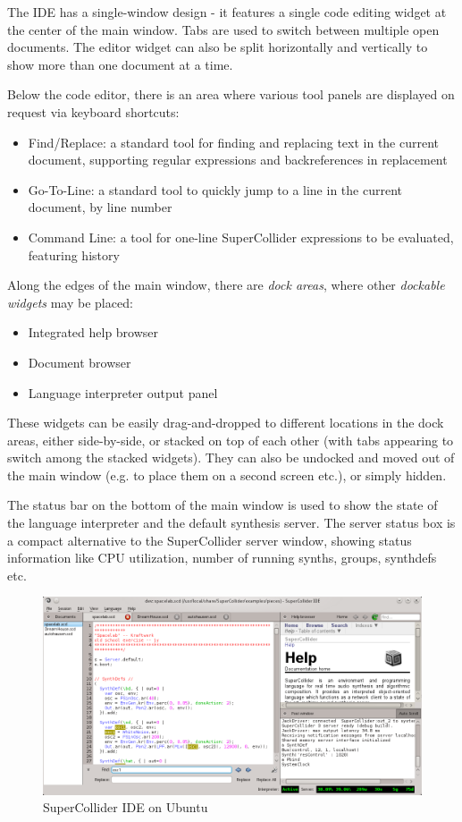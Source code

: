 \documentclass[11pt,a4paper]{article}
\begin{document}
The IDE has a single-window design - it features a single code editing widget at the center of the main window. Tabs are
used to switch between multiple open documents. The editor widget can also be split horizontally and vertically to show
more than one document at a time.

Below the code editor, there is an area where various tool panels are displayed on request via keyboard shortcuts:
\begin{itemize}
  \item Find/Replace: a standard tool for finding and replacing text in the current document, supporting regular
expressions and backreferences in replacement
  \item Go-To-Line: a standard tool to quickly jump to a line in the current document, by line number
  \item Command Line: a tool for one-line SuperCollider expressions to be evaluated, featuring history
\end{itemize}

Along the edges of the main window, there are \emph{dock areas}, where other \emph{dockable widgets} may be placed:
\begin{itemize}
  \item Integrated help browser
  \item Document browser
  \item Language interpreter output panel
\end{itemize}

These widgets can be easily drag-and-dropped to different locations in the dock areas, either side-by-side, or stacked
on top of each other (with tabs appearing to switch among the stacked widgets). They can also be undocked and moved out
of the main window (e.g. to place them on a second screen etc.), or simply hidden.

The status bar on the bottom of the main window is used to show the state of the language interpreter and the default
synthesis server. The server status box is a compact alternative to the SuperCollider server window, showing status
information like CPU utilization, number of running synths, groups, synthdefs etc.

\begin{figure}
  \centering
  \includegraphics[width=\textwidth]{overview}
  \caption{SuperCollider IDE on Ubuntu}
  \label{fig:mainwin}
\end{figure}
\end{document}
